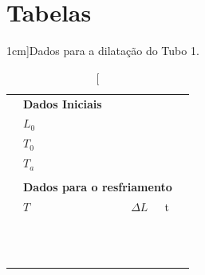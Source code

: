 \section{Tabelas}
\begin{table}[!ht]
\caption[][1cm]{Dados para a dilatação do Tubo 1.}
\label{Tab:DadosTubo1}
\centering
	\begin{tabular}{lllll}
		\toprule
		&\textbf{Dados Iniciais}\\
		\cmidrule{2-3}
		& \cellcolor[gray]{0.89}$L_0$ &\cellcolor[gray]{0.92}\\
		& \cellcolor[gray]{0.95}$T_0$ & \cellcolor[gray]{0.97}\\
		& \cellcolor[gray]{0.89}$T_a$ & \cellcolor[gray]{0.92}\\
		\cmidrule{2-3}
\\
		&\multicolumn{3}{l}{\textbf{Dados para o resfriamento}} \\
		\cmidrule{2-4}
		& $T$ & $\Delta L$ & t &\\
		\cmidrule{2-4}
		& \cellcolor[gray]{0.89} \phantom{xxxxxxxxxxxxxxxxxxxx}& \cellcolor[gray]{0.92} \phantom{xxxxxxxxxxxxxxxxxxxx} &  \cellcolor[gray]{0.89} \phantom{xxxxxxxxxxxxxxxxxxxx} \\
		& \cellcolor[gray]{0.95} & \cellcolor[gray]{0.97} & \cellcolor[gray]{0.95} \\
		& \cellcolor[gray]{0.89} & \cellcolor[gray]{0.92} & \cellcolor[gray]{0.89} \\
		& \cellcolor[gray]{0.95} & \cellcolor[gray]{0.97} & \cellcolor[gray]{0.95} \\
		& \cellcolor[gray]{0.89} & \cellcolor[gray]{0.92} & \cellcolor[gray]{0.89} \\
		& \cellcolor[gray]{0.95} & \cellcolor[gray]{0.97} & \cellcolor[gray]{0.95} \\
		& \cellcolor[gray]{0.89} & \cellcolor[gray]{0.92} & \cellcolor[gray]{0.89} \\
		& \cellcolor[gray]{0.95} & \cellcolor[gray]{0.97} & \cellcolor[gray]{0.95} \\
		& \cellcolor[gray]{0.89} & \cellcolor[gray]{0.92} & \cellcolor[gray]{0.89} \\
		& \cellcolor[gray]{0.95} & \cellcolor[gray]{0.97} & \cellcolor[gray]{0.95} \\
		& \cellcolor[gray]{0.89} & \cellcolor[gray]{0.92} & \cellcolor[gray]{0.89} \\
		& \cellcolor[gray]{0.95} & \cellcolor[gray]{0.97} & \cellcolor[gray]{0.95} \\

\end{tabular}
\end{table}
